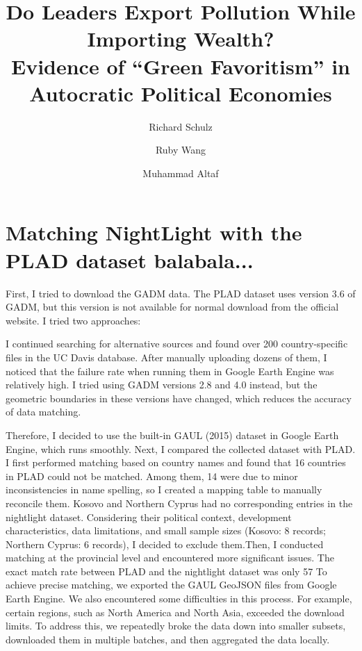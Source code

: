 \documentclass[12pt]{article}
\date{}
\title{Do Leaders Export Pollution While Importing Wealth? \\ 
\large Evidence of ``Green Favoritism'' in Autocratic Political Economies}
\author{Richard Schulz \and Ruby Wang \and Muhammad Altaf}
\begin{document}
\maketitle

\section{Matching NightLight with the PLAD dataset balabala...}
First, I tried to download the GADM data. The PLAD dataset uses version 3.6 of GADM, but this version is not available for normal download from the official website. I tried two approaches:

I continued searching for alternative sources and found over 200 country-specific files in the UC Davis database. After manually uploading dozens of them, I noticed that the failure rate when running them in Google Earth Engine was relatively high.
I tried using GADM versions 2.8 and 4.0 instead, but the geometric boundaries in these versions have changed, which reduces the accuracy of data matching.

Therefore, I decided to use the built-in GAUL (2015) dataset in Google Earth Engine, which runs smoothly. Next, I compared the collected dataset with PLAD. I first performed matching based on country names and found that 16 countries in PLAD could not be matched. Among them, 14 were due to minor inconsistencies in name spelling, so I created a mapping table to manually reconcile them. Kosovo and Northern Cyprus had no corresponding entries in the nightlight dataset. Considering their political context, development characteristics, data limitations, and small sample sizes (Kosovo: 8 records; Northern Cyprus: 6 records), I decided to exclude them.Then, I conducted matching at the provincial level and encountered more significant issues. The exact match rate between PLAD and the nightlight dataset was only 57%
To achieve precise matching, we exported the GAUL GeoJSON files from Google Earth Engine. We also encountered some difficulties in this process. For example, certain regions, such as North America and North Asia, exceeded the download limits. To address this, we repeatedly broke the data down into smaller subsets, downloaded them in multiple batches, and then aggregated the data locally.
\end{document}
